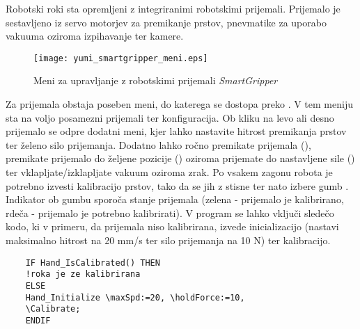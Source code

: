 Robotski roki sta opremljeni z integriranimi robotskimi prijemali. Prijemalo je sestavljeno iz servo motorjev za premikanje prstov, pnevmatike za uporabo vakuuma oziroma izpihavanje ter kamere.

\begin{figure}[!bht]
	\centering
	\texttt{[image: yumi\_smartgripper\_meni.eps]}
	\caption{Meni za upravljanje z robotskimi prijemali \emph{SmartGripper}}
	\label{fig:yumi_smart_meni}
\end{figure}

Za prijemala obstaja poseben meni, do katerega se dostopa preko . V tem meniju sta na voljo posamezni prijemali ter konfiguracija. Ob kliku na levo ali desno prijemalo se odpre dodatni meni, kjer lahko nastavite hitrost premikanja prstov ter želeno silo prijemanja. Dodatno lahko ročno premikate prijemala (), premikate prijemalo do željene pozicije () oziroma prijemate do nastavljene sile () ter vklapljate/izklapljate vakuum oziroma zrak. Po vsakem zagonu robota je potrebno izvesti kalibracijo prstov, tako da se jih z  stisne ter nato izbere gumb . Indikator ob gumbu sporoča stanje prijemala (zelena - prijemalo je kalibrirano, rdeča - prijemalo je potrebno kalibrirati). V program se lahko vključi sledečo kodo, ki v primeru, da prijemala niso kalibrirana, izvede inicializacijo (nastavi maksimalno hitrost na 20 mm/s ter silo prijemanja na 10 N) ter kalibracijo.



\begin{verbatim}
	IF Hand_IsCalibrated() THEN
	!roka je ze kalibrirana
	ELSE
	Hand_Initialize \maxSpd:=20, \holdForce:=10,
	\Calibrate;
	ENDIF
\end{verbatim}

